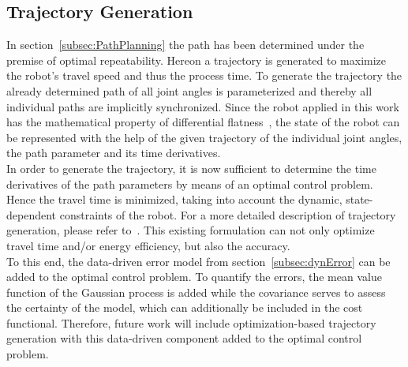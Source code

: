 \documentclass[5p,times,procedia]{elsarticle}
\begin{document}
\subsection{Trajectory Generation}
In section~\ref{subsec:PathPlanning} the path has been determined under the premise of optimal repeatability. Hereon a trajectory is generated to maximize the robot’s travel speed and thus the process time.
To generate the trajectory the already determined path of all joint angles is parameterized and thereby all individual paths are implicitly synchronized.
Since the robot applied in this work has the mathematical property of differential flatness~\cite{Hoffmann23}, the state of the robot can be represented with the help of the given trajectory of the individual joint angles, the path parameter and its time derivatives.\\
In order to generate the trajectory, it is now sufficient to determine the time derivatives of the path parameters by means of an optimal control problem. 
Hence the travel time is minimized, taking into account the dynamic, state-dependent constraints of the robot. For a more detailed description of trajectory generation, please refer to~\cite{Kanagalingam24}.
%
This existing formulation can not only optimize travel time and/or energy efficiency, but also the accuracy.\\
To this end, the data-driven error model from section~\ref{subsec:dynError} can be added to the optimal control problem.
To quantify the errors, the mean value function of the Gaussian process is added while the covariance serves to assess the certainty of the model, which can additionally be included in the cost functional. Therefore, future work will include optimization-based trajectory generation with this data-driven component added to the optimal control problem.
%
\end{document}

